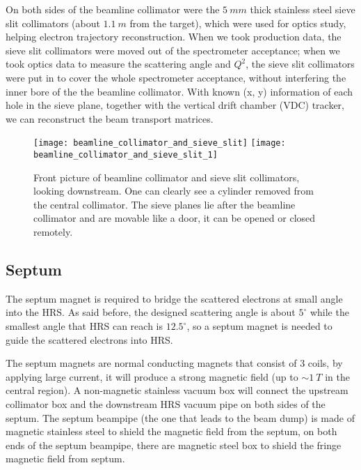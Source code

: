 On both sides of the beamline collimator were the $5\ mm$ thick stainless steel
sieve slit collimators (about $1.1\ m$ from the target), which    %
were used for optics study, helping electron trajectory reconstruction. When
we took production data, the sieve slit collimators were moved out of the spectrometer
acceptance; when we took optics data to measure the scattering angle and $Q^2$,
the sieve slit collimators were put in to cover the whole spectrometer acceptance,
without interfering the inner bore of the the beamline collimator. With known
(x, y) information of each hole in the sieve plane, together with the vertical
drift chamber (VDC) tracker, we can reconstruct the beam transport matrices.
\begin{figure}[h!]
    \centering
    \texttt{[image: beamline\_collimator\_and\_sieve\_slit]}
    \hspace{1cm}
    \texttt{[image: beamline\_collimator\_and\_sieve\_slit\_1]}
    \caption{Front picture of beamline collimator and sieve slit collimators, looking 
    downstream. One can clearly see a cylinder removed from the central collimator.
    The sieve planes lie after the beamline collimator and are movable like
    a door, it can be opened or closed remotely.}
\end{figure}

\subsection{Septum}
The septum magnet is required to bridge the scattered electrons at small angle
into the HRS. As said before, the designed scattering angle is about $5^\circ$
while the smallest angle that HRS can reach is $12.5^\circ$, so a septum magnet 
is needed to guide the scattered electrons into HRS. 

The septum magnets are normal conducting magnets that consist of 3 coils, 
by applying large current, it will produce a
strong magnetic field (up to $\sim 1 \ T$ in the central region). A non-magnetic
stainless vacuum box will connect the upstream collimator box and the downstream 
HRS vacuum pipe on both sides of the septum. The septum beampipe (the one that
leads to the beam dump) is made of magnetic stainless steel to shield the
magnetic field from the septum, on both ends of the septum beampipe, there
are magnetic steel box to shield the fringe magnetic field from septum. 

